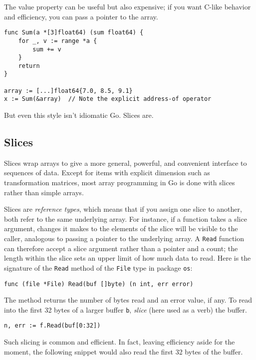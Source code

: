 The value property can be useful but also expensive; if you want C-like
behavior and efficiency, you can pass a pointer to the array.

\begin{Verbatim}[frame=single]
func Sum(a *[3]float64) (sum float64) {
    for _, v := range *a {
        sum += v
    }
    return
}

array := [...]float64{7.0, 8.5, 9.1}
x := Sum(&array)  // Note the explicit address-of operator
\end{Verbatim}

But even this style isn't idiomatic Go. Slices are.

\subsection*{Slices}

Slices wrap arrays to give a more general, powerful, and convenient
interface to sequences of data. Except for items with explicit dimension
such as transformation matrices, most array programming in Go is done
with slices rather than simple arrays.

Slices are \emph{reference types}, which means that if you assign one
slice to another, both refer to the same underlying array. For instance,
if a function takes a slice argument, changes it makes to the elements
of the slice will be visible to the caller, analogous to passing a
pointer to the underlying array. A \texttt{Read} function can therefore
accept a slice argument rather than a pointer and a count; the length
within the slice sets an upper limit of how much data to read. Here is
the signature of the \texttt{Read} method of the \texttt{File} type in
package \texttt{os}:

\begin{Verbatim}[frame=single]
func (file *File) Read(buf []byte) (n int, err error)
\end{Verbatim}

The method returns the number of bytes read and an error value, if any.
To read into the first 32 bytes of a larger buffer \texttt{b},
\emph{slice} (here used as a verb) the buffer.

\begin{Verbatim}[frame=single]
    n, err := f.Read(buf[0:32])
\end{Verbatim}

Such slicing is common and efficient. In fact, leaving efficiency aside
for the moment, the following snippet would also read the first 32 bytes
of the buffer.

